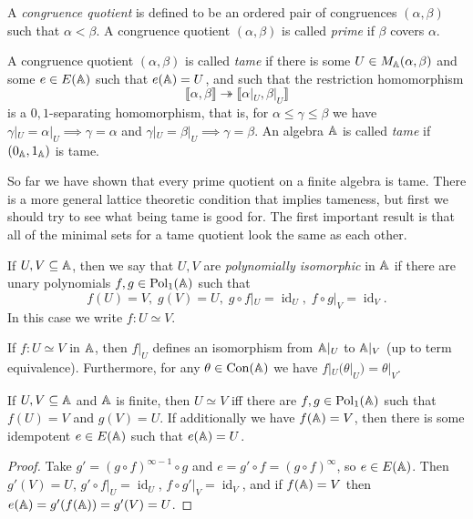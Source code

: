 \begin{appendices}
\begin{defn}\label{defn-tame} A \emph{congruence quotient} is defined to be an ordered pair of congruences $(\alpha,\beta)$ such that $\alpha < \beta$. A congruence quotient $(\alpha,\beta)$ is called \emph{prime} if $\beta$ covers $\alpha$.

A congruence quotient $(\alpha,\beta)$ is called \emph{tame} if there is some $U \in M_{\mathbb{A}}(\alpha,\beta)$ and some $e \in E(\mathbb{A})$ such that $e(\mathbb{A}) = U$, and such that the restriction homomorphism
\[
\llbracket \alpha, \beta \rrbracket \twoheadrightarrow \llbracket \alpha|_U, \beta|_U \rrbracket
\]
is a $0,1$-separating homomorphism, that is, for $\alpha \le \gamma \le \beta$ we have $\gamma|_U = \alpha|_U \implies \gamma = \alpha$ and $\gamma|_U = \beta|_U \implies \gamma = \beta$. An algebra $\mathbb{A}$ is called \emph{tame} if $(0_{\mathbb{A}},1_{\mathbb{A}})$ is tame.
\end{defn}

So far we have shown that every prime quotient on a finite algebra is tame. There is a more general lattice theoretic condition that implies tameness, but first we should try to see what being tame is good for. The first important result is that all of the minimal sets for a tame quotient look the same as each other.

\begin{defn} If $U,V \subseteq \mathbb{A}$, then we say that $U,V$ are \emph{polynomially isomorphic} in $\mathbb{A}$ if there are unary polynomials $f,g \in \operatorname{Pol}_1(\mathbb{A})$ such that
\[
f(U) = V, \; g(V) = U, \; g\circ f|_U = \operatorname{id}_U, \; f\circ g|_V = \operatorname{id}_V.
\]
In this case we write $f : U \simeq V$.
\end{defn}

\begin{prop} If $f : U \simeq V$ in $\mathbb{A}$, then $f|_U$ defines an isomorphism from $\mathbb{A}|_U$ to $\mathbb{A}|_V$ (up to term equivalence). Furthermore, for any $\theta \in \operatorname{Con}(\mathbb{A})$ we have $f|_U(\theta|_U) = \theta|_V$.
\end{prop}

\begin{prop} If $U,V \subseteq \mathbb{A}$ and $\mathbb{A}$ is finite, then $U \simeq V$ iff there are $f, g \in \operatorname{Pol}_1(\mathbb{A})$ such that $f(U) = V$ and $g(V) = U$. If additionally we have $f(\mathbb{A}) = V$, then there is some idempotent $e \in E(\mathbb{A})$ such that $e(\mathbb{A}) = U$.
\end{prop}
\begin{proof} Take $g' = (g \circ f)^{\infty - 1}\circ g$ and $e = g' \circ f = (g \circ f)^{\infty}$, so $e \in E(\mathbb{A})$. Then $g'(V) = U$, $g'\circ f|_U = \operatorname{id}_U$, $f\circ g'|_V = \operatorname{id}_V$, and if $f(\mathbb{A}) = V$ then $e(\mathbb{A}) = g'(f(\mathbb{A})) = g'(V) = U$.
\end{proof}


\end{appendices}
